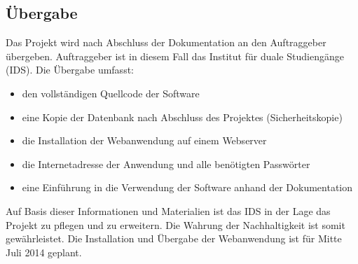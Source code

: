 \subsection{Übergabe}
\label{sec:Uebergabe}

Das Projekt wird nach Abschluss der Dokumentation an den Auftraggeber übergeben.
Auftraggeber ist in diesem Fall das Institut für duale Studiengänge (IDS). Die
Übergabe umfasst:

\begin{itemize}
  \item den vollständigen Quellcode der Software
  \item eine Kopie der Datenbank nach Abschluss des Projektes (Sicherheitskopie)
  \item die Installation der Webanwendung auf einem Webserver
  \item die Internetadresse der Anwendung und alle benötigten Passwörter
  \item eine Einführung in die Verwendung der Software anhand der Dokumentation
\end{itemize}

Auf Basis dieser Informationen und Materialien ist das IDS in der Lage das
Projekt zu pflegen und zu erweitern. Die Wahrung der Nachhaltigkeit ist somit
gewährleistet. Die Installation und Übergabe der Webanwendung ist für Mitte
Juli 2014 geplant.
